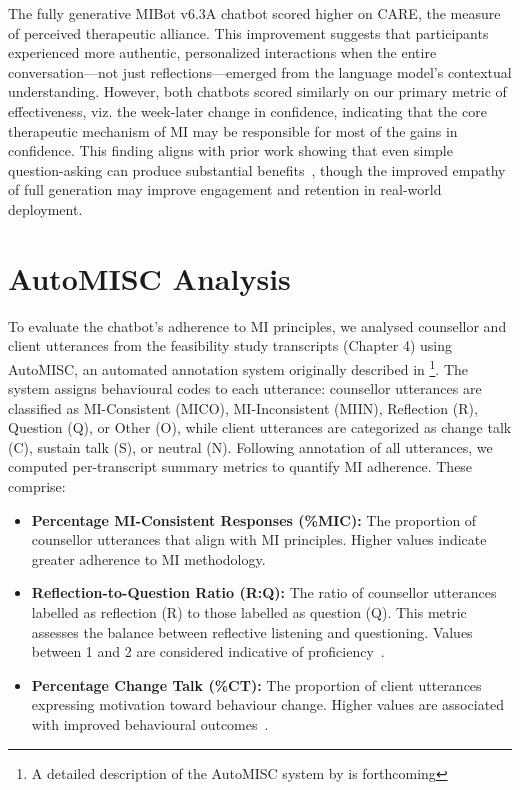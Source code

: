 The fully generative MIBot v6.3A chatbot scored higher on CARE, the measure of perceived therapeutic alliance. This improvement suggests that participants experienced more authentic, personalized interactions when the entire conversation---not just reflections---emerged from the language model's contextual understanding. However, both chatbots scored similarly on our primary metric of effectiveness, viz. the week-later change in confidence, indicating that the core therapeutic mechanism of MI may be responsible for most of the gains in confidence. This finding aligns with prior work showing that even simple question-asking can produce substantial benefits~\citep{brown2023mi}, though the improved empathy of full generation may improve engagement and retention in real-world deployment.

\section{AutoMISC Analysis}
\label{sec:mi-adherence}

To evaluate the chatbot's adherence to MI principles, we analysed counsellor and client utterances from the feasibility study transcripts (Chapter 4) using AutoMISC, an automated annotation system originally described in \citet{mahmood-etal-2025-fully}\footnote{A detailed description of the AutoMISC system by \citet{ali2025automated} is forthcoming}.
The system assigns behavioural codes to each utterance: counsellor utterances are classified as MI-Consistent (MICO), MI-Inconsistent (MIIN), Reflection (R), Question (Q), or Other (O), while client utterances are categorized as change talk (C), sustain talk (S), or neutral (N). Following annotation of all utterances, we computed per-transcript summary metrics to quantify MI adherence. These comprise:

\begin{itemize}

	\item \textbf{Percentage MI-Consistent Responses (\%MIC):} The proportion of counsellor utterances that align with MI principles. Higher values indicate greater adherence to MI methodology.

	\item \textbf{Reflection-to-Question Ratio (R:Q):} The ratio of counsellor utterances labelled as reflection (R) to those labelled as question (Q). This metric assesses the balance between reflective listening and questioning. Values between 1 and 2 are considered indicative of proficiency~\citep{moyers2016miti}.

	\item \textbf{Percentage Change Talk (\%CT):} The proportion of client utterances expressing motivation toward behaviour change. Higher values are associated with improved behavioural outcomes~\citep{Apodaca2009}.

\end{itemize}

